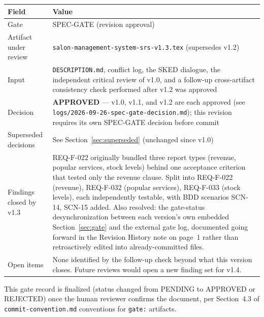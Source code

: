 \documentclass[11pt,a4paper]{article}
\begin{document}
\begin{tabularx}{\textwidth}{@{}lX@{}}
\toprule
Field & Value \\
\midrule

Gate &
SPEC-GATE (revision approval) \\

Artifact under review &
\texttt{salon-management-system-srs-v1.3.tex} (supersedes v1.2) \\

Input &
\texttt{DESCRIPTION.md}, conflict log, the SKED dialogue, the
independent critical review of v1.0, and a follow-up cross-artifact
consistency check performed after v1.2 was approved \\

Decision &
\textbf{APPROVED} --- v1.0, v1.1, and v1.2 are each approved
(see \texttt{logs/2026-09-26-spec-gate-decision.md}); this revision
requires its own SPEC-GATE decision before commit \\

Superseded decisions &
See Section~\ref{sec:superseded} (unchanged since v1.0) \\

Findings closed by v1.3 &
REQ-F-022 originally bundled three report types (revenue, popular
services, stock levels) behind one acceptance criterion that tested only
the revenue clause. Split into REQ-F-022 (revenue), REQ-F-032
(popular services), REQ-F-033 (stock levels), each independently
testable, with BDD scenarios SCN-14, SCN-15 added. Also resolved: the
gate-status desynchronization between each version's own embedded
Section~\ref{sec:gate} and the external gate log, documented going
forward in the Revision History note on page~1 rather than retroactively
edited into already-committed files. \\

Open items &
None identified by the follow-up check beyond what this version closes.
Future reviews would open a new finding set for v1.4. \\

\bottomrule
\end{tabularx}

\noindent
This gate record is finalized (status changed from PENDING to APPROVED or
REJECTED) once the human reviewer confirms the document, per
Section~4.3 of \texttt{commit-convention.md} conventions for
\texttt{gate:} artifacts.
\end{document}
